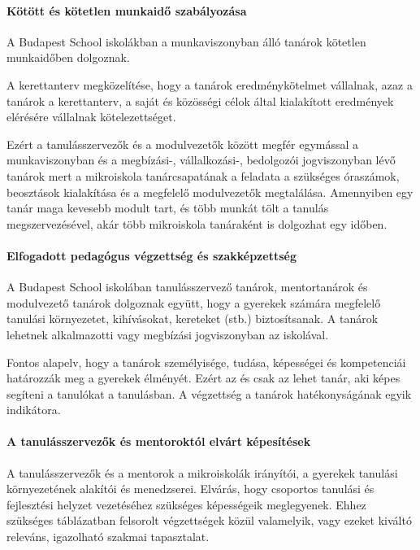 \paragraph{Kötött és kötetlen munkaidő szabályozása}

A Budapest School  iskolákban a munkaviszonyban álló tanárok kötetlen
munkaidőben dolgoznak.

A kerettanterv megközelítése, hogy a tanárok
eredménykötelmet vállalnak, azaz a tanárok a kerettanterv, a saját és közösségi
célok által kialakított eredmények elérésére vállalnak kötelezettséget.

Ezért a tanulásszervezők és a modulvezetők között megfér egymással a
munkaviszonyban és a megbízási-, vállalkozási-, bedolgozói jogviszonyban
lévő tanárok mert a mikroiskola tanárcsapatának a
feladata a szükséges óraszámok, beosztások kialakítása és a megfelelő
modulvezetők megtalálása. Amennyiben egy tanár maga kevesebb modult tart, és
több munkát tölt a tanulás megszervezésével, akár több mikroiskola tanáraként
is dolgozhat egy időben.

\paragraph{Elfogadott pedagógus végzettség és szakképzettség}

A Budapest School iskolában tanulásszervező tanárok, mentortanárok és
modulvezető tanárok dolgoznak együtt, hogy a gyerekek számára megfelelő
tanulási környezetet, kihívásokat, kereteket (stb.) biztosítsanak. A tanárok
lehetnek alkalmazotti vagy megbízási jogviszonyban az iskolával.

Fontos alapelv, hogy a tanárok személyisége, tudása, képességei és
kompetenciái határozzák meg a gyerekek élményét.  Ezért az és csak az lehet
tanár, aki képes segíteni a tanulókat a
tanulásban. A végzettség a tanárok hatékonyságának egyik indikátora.

\paragraph{A tanulásszervezők és mentoroktól elvárt képesítések} A
tanulásszervezők és a mentorok a mikroiskolák irányítói, a gyerekek tanulási
környezetének alakítói és menedzserei. Elvárás, hogy csoportos tanulási és
fejlesztési helyzet vezetéséhez szükséges képességeik meglegyenek. Ehhez
szükséges  táblázatban felsorolt végzettségek közül
valamelyik, vagy ezeket kiváltó
releváns, igazolható szakmai tapasztalat.

